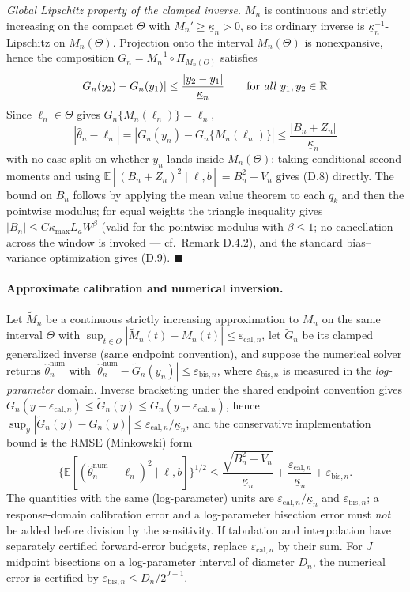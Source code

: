 \emph{Global Lipschitz property of the clamped inverse.} $M_n$ is continuous and strictly increasing on the compact $\Theta$ with $M_n'\ge\underline\kappa_n>0$, so its ordinary inverse is $\underline\kappa_n^{-1}$-Lipschitz on $M_n(\Theta)$. Projection onto the interval $M_n(\Theta)$ is nonexpansive, hence the composition $G_n=M_n^{-1}\circ\Pi_{M_n(\Theta)}$ satisfies
\[
|G_n(y_2)-G_n(y_1)|\le\frac{|y_2-y_1|}{\underline\kappa_n}
\qquad\text{for \emph{all} }y_1,y_2\in\mathbb R .
\]
Since $\ell_n\in\Theta$ gives $G_n\{M_n(\ell_n)\}=\ell_n$,
\[
|\hat\theta_n-\ell_n|=|G_n(y_n)-G_n\{M_n(\ell_n)\}|
\le\frac{|B_n+Z_n|}{\underline\kappa_n}
\]
with no case split on whether $y_n$ lands inside $M_n(\Theta)$: taking conditional second moments and using $\mathbb E[(B_n+Z_n)^2\mid\ell,b]=B_n^2+V_n$ gives (D.8) directly. The bound on $B_n$ follows by applying the mean value theorem to each $q_k$ and then the pointwise modulus; for equal weights the triangle inequality gives $|B_n|\le C\kappa_{\max}L_aW^{\beta}$ (valid for the pointwise modulus with $\beta\le1$; no cancellation across the window is invoked --- cf.\ Remark D.4.2), and the standard bias--variance optimization gives (D.9). \hfill$\blacksquare$

\paragraph{Approximate calibration and numerical inversion.} Let $\widetilde M_n$ be a continuous strictly increasing approximation to $M_n$ on the same interval $\Theta$ with
$\sup_{t\in\Theta}|\widetilde M_n(t)-M_n(t)|\le\varepsilon_{\mathrm{cal},n}$,
let $\widetilde G_n$ be its clamped generalized inverse (same endpoint convention), and suppose the numerical solver returns $\hat\theta_n^{\mathrm{num}}$ with $|\hat\theta_n^{\mathrm{num}}-\widetilde G_n(y_n)|\le\varepsilon_{\mathrm{bis},n}$, where $\varepsilon_{\mathrm{bis},n}$ is measured in the \emph{log-parameter} domain. Inverse bracketing under the shared endpoint convention gives $G_n(y-\varepsilon_{\mathrm{cal},n})\le\widetilde G_n(y)\le G_n(y+\varepsilon_{\mathrm{cal},n})$, hence $\sup_y|\widetilde G_n(y)-G_n(y)|\le\varepsilon_{\mathrm{cal},n}/\underline\kappa_n$, and the conservative implementation bound is the RMSE (Minkowski) form
\begin{equation}
\big\{\mathbb E[(\hat\theta_n^{\mathrm{num}}-\ell_n)^2\mid\ell,b]\big\}^{1/2}
\le\frac{\sqrt{B_n^2+V_n}}{\underline\kappa_n}
+\frac{\varepsilon_{\mathrm{cal},n}}{\underline\kappa_n}
+\varepsilon_{\mathrm{bis},n}.
\tag{D.8b}
\end{equation}
The quantities with the same (log-parameter) units are $\varepsilon_{\mathrm{cal},n}/\underline\kappa_n$ and $\varepsilon_{\mathrm{bis},n}$; a response-domain calibration error and a log-parameter bisection error must \emph{not} be added before division by the sensitivity. If tabulation and interpolation have separately certified forward-error budgets, replace $\varepsilon_{\mathrm{cal},n}$ by their sum. For $J$ midpoint bisections on a log-parameter interval of diameter $D_n$, the numerical error is certified by $\varepsilon_{\mathrm{bis},n}\le D_n/2^{J+1}$.

